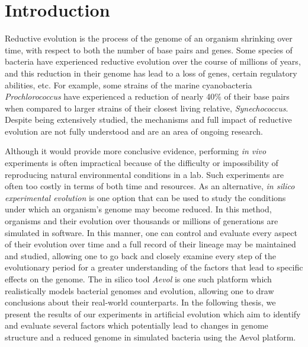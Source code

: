\chapter{Introduction}\label{ch:intro}
Reductive evolution is the process of the genome of an organism shrinking over time, with respect to both the number of base pairs and genes. Some species of bacteria have experienced reductive evolution over the course of millions of years, and this reduction in their genome has lead to a loss of genes, certain regulatory abilities, etc. For example, some strains of the marine cyanobacteria \textit{Prochlorococcus} have experienced a reduction of nearly 40\% of their base pairs when compared to larger strains of their closest living relative, \textit{Synechococcus}\cite{sun_zhiyi_blanchard}. Despite being extensively studied, the mechanisms and full impact of reductive evolution are not fully understood and are an area of ongoing research. 

Although it would provide more conclusive evidence, performing \textit{in vivo} experiments is often impractical because of the difficulty or impossibility of reproducing natural environmental conditions in a lab. Such experiments are often too costly in terms of both time and resources. As an alternative, \textit{in silico experimental evolution} is one option that can be used to study the conditions under which an organism's genome may become reduced. In this method, organisms and their evolution over thousands or millions of generations are simulated in software. In this manner, one can control and evaluate every aspect of their evolution over time and a full record of their lineage may be maintained and studied, allowing one to go back and closely examine every step of the evolutionary period for a greater understanding of the factors that lead to specific effects on the genome. The in silico tool \textit{Aevol} is one such platform which realistically models bacterial genomes and evolution, allowing one to draw conclusions about their real-world counterparts. In the following thesis, we present the results of our experiments in artificial evolution which aim to identify and evaluate several factors which potentially lead to changes in genome structure and a reduced genome in simulated bacteria using the Aevol platform. 

